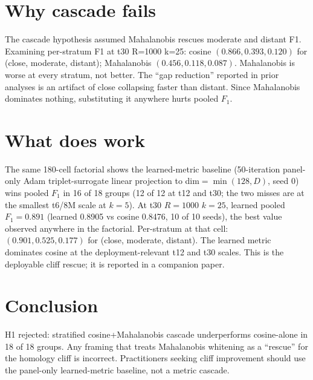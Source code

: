 \documentclass[11pt]{article}
\begin{document}
\section{Why cascade fails}
The cascade hypothesis assumed Mahalanobis rescues moderate and distant F1. Examining per-stratum F1 at t30 R=1000 k=25: cosine $(0.866, 0.393, 0.120)$ for (close, moderate, distant); Mahalanobis $(0.456, 0.118, 0.087)$. Mahalanobis is worse at every stratum, not better. The ``gap reduction'' reported in prior analyses is an artifact of close collapsing faster than distant. Since Mahalanobis dominates nothing, substituting it anywhere hurts pooled $F_1$.

\section{What does work}
The same 180-cell factorial shows the learned-metric baseline (50-iteration panel-only Adam triplet-surrogate linear projection to dim$=\min(128, D)$, seed 0) wins pooled $F_1$ in 16 of 18 groups (12 of 12 at t12 and t30; the two misses are at the smallest t6/8M scale at $k=5$). At t30 $R{=}1000$ $k{=}25$, learned pooled $F_1 = 0.891$ (learned 0.8905 vs cosine 0.8476, 10 of 10 seeds), the best value observed anywhere in the factorial. Per-stratum at that cell: $(0.901, 0.525, 0.177)$ for (close, moderate, distant). The learned metric dominates cosine at the deployment-relevant t12 and t30 scales. This is the deployable cliff rescue; it is reported in a companion paper.

\section{Conclusion}
H1 rejected: stratified cosine+Mahalanobis cascade underperforms cosine-alone in 18 of 18 groups. Any framing that treats Mahalanobis whitening as a ``rescue'' for the homology cliff is incorrect. Practitioners seeking cliff improvement should use the panel-only learned-metric baseline, not a metric cascade.
\end{document}
